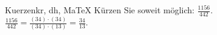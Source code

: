 \begin{MAufgabe}{Kuerzen}{kr, dh, MaTeX}
K\"urzen Sie soweit m\"oglich: $\frac{1156}{442}$.\\ 
\ifLsg\MLoesung
\quad $\frac{1156}{442}=\frac{(34)\cdot(34)}{(34)\cdot(13)}=\frac{34}{13}$.\else\relax\fi
 \end{MAufgabe}